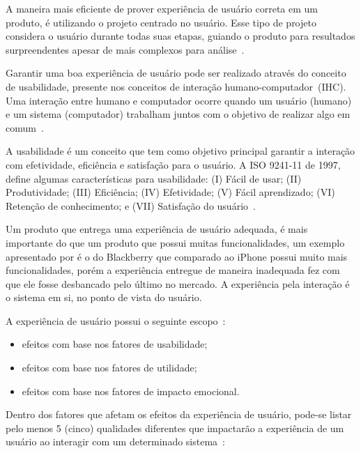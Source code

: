 A maneira mais eficiente de prover experiência de usuário correta em um produto, é utilizando o projeto centrado no usuário. Esse tipo de projeto considera o usuário durante todas suas etapas, guiando o produto para resultados surpreendentes apesar de mais complexos para análise~\cite{garrett:2010}.

Garantir uma boa experiência de usuário pode ser realizado através do conceito de usabilidade, presente nos conceitos de interação humano-computador~(IHC). Uma interação entre humano e computador ocorre quando um usuário (humano) e um sistema (computador) trabalham juntos com o objetivo de realizar algo em comum~\cite{hartson:2012}.

A usabilidade é um conceito que tem como objetivo principal garantir a interação com efetividade, eficiência e satisfação para o usuário. A ISO 9241-11 de 1997, define algumas características para usabilidade: (I) Fácil de usar; (II) Produtividade; (III) Eficiência; (IV) Efetividade; (V) Fácil aprendizado; (VI) Retenção de conhecimento; e (VII) Satisfação do usuário~\cite{hartson:2012}.

Um produto que entrega uma experiência de usuário adequada, é mais importante do que um produto que possui muitas funcionalidades, um exemplo apresentado por  é o do Blackberry que comparado ao iPhone possui muito mais funcionalidades, porém a experiência entregue de maneira inadequada fez com que ele fosse desbancado pelo último no mercado. A experiência pela interação é o sistema em si, no ponto de vista do usuário.

A experiência de usuário possui o seguinte escopo~\cite{hartson:2012}:

\begin{itemize}
    \item efeitos com base nos fatores de usabilidade;
    \item efeitos com base nos fatores de utilidade;
    \item efeitos com base nos fatores de impacto emocional.
\end{itemize}

Dentro dos fatores que afetam os efeitos da experiência de usuário, pode-se listar pelo menos 5 (cinco) qualidades diferentes que impactarão a experiência de um usuário ao interagir com um determinado sistema~\cite{hartson:2012}:

